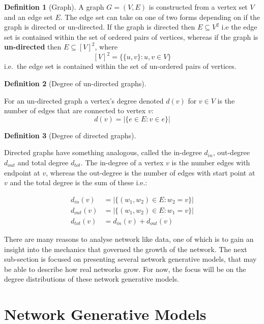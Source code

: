 \documentclass[
  10pt,
  a4paper,
]{scrreprt}
\theoremstyle{definition}
\newtheorem{definition}{Definition}[section]
\theoremstyle{plain}
\theoremstyle{plain}
\theoremstyle{plain}
\theoremstyle{remark}
\begin{document}
{\begin{definition}[Graph]
A graph \(G = (V,E)\) is constructed from a vertex set \(V\) and an edge
set \(E\). The edge set can take on one of two forms depending on if the
graph is directed or un-directed. If the graph is directed then
\(E\subseteq V^2\) i.e the edge set is contained within the set of
ordered pairs of vertices, whereas if the graph is \textbf{un-directed}
then \(E\subseteq [V]^2\), where \[
[V]^2 = \{\{u,v\}:u,v\in V\}
\] i.e.~the edge set is contained within the set of un-ordered pairs of
vertices.

\end{definition}

\begin{definition}[Degree of un-directed
graphs]\protect\hypertarget{def-deg}{}\label{def-deg}

For an un-directed graph a vertex's degree denoted \(d(v)\) for
\(v\in V\) is the number of edges that are connected to vertex \(v\): \[
d(v) = |\{e\in E : v \in e\}|
\]

\end{definition}

\begin{definition}[Degree of directed
graphs]\protect\hypertarget{def-dirdeg}{}\label{def-dirdeg}

Directed graphs have something analogous, called the in-degree
\(d_{in}\), out-degree \(d_{out}\) and total degree \(d_{tot}\). The
in-degree of a vertex \(v\) is the number edges with endpoint at \(v\),
whereas the out-degree is the number of edges with start point at \(v\)
and the total degree is the sum of these i.e.:

\begin{align*}
d_{in}(v)&= |\{(w_1,w_2)\in E: w_2=v \}|\\
d_{out}(v) &= |\{(w_1,w_2)\in E: w_1=v \}|\\
d_{tot}(v) &= d_{in}(v) + d_{out}(v)
\end{align*}

\end{definition}

There are many reasons to analyse network like data, one of which is to
gain an insight into the mechanics that governed the growth of the
network. The next sub-section is focused on presenting several network
generative models, that may be able to describe how real networks grow.
For now, the focus will be on the degree distributions of these network
generative models.

\hypertarget{sec-gen}{%
\section{Network Generative Models}\label{sec-gen}}

}
\end{document}
